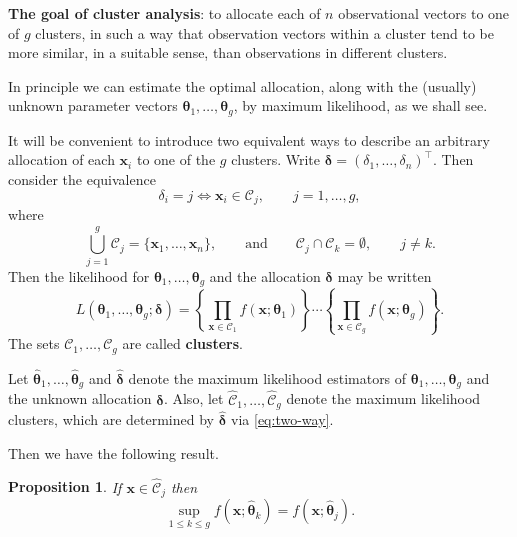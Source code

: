 \documentclass[]{book}
\newtheorem{proposition}{Proposition}[chapter]
\theoremstyle{definition}
\theoremstyle{definition}
\theoremstyle{definition}
\theoremstyle{remark}
\begin{document}
\textbf{The goal of cluster analysis}: to allocate each of \(n\) observational vectors to one of \(g\) clusters, in such a way that observation vectors within a cluster tend to be more similar, in a suitable sense, than observations in different clusters.

In principle we can estimate the optimal allocation, along with the (usually) unknown parameter vectors \(\boldsymbol \theta_1, \ldots , \boldsymbol \theta_g\), by maximum likelihood, as we shall see.

It will be convenient to introduce two equivalent ways to describe an arbitrary allocation of each \(\boldsymbol x_i\) to one of the \(g\) clusters. Write \(\boldsymbol \delta=(\delta_1,\ldots , \delta_n)^\top\). Then consider the equivalence
\begin{equation}
\delta_i = j \iff \boldsymbol x_i \in \mathcal{C}_j, \qquad j=1,\ldots , g,
\label{eq:two-way}
\end{equation}
where
\[
\bigcup_{j=1}^g \mathcal{C}_j = \{\boldsymbol x_1, \ldots , \boldsymbol x_n\}, \qquad \text{and} \qquad \mathcal{C}_j \cap \mathcal{C}_{k} =\emptyset,\qquad j \neq k.
\]
Then the likelihood for \(\boldsymbol \theta_1, \ldots , \boldsymbol \theta_g\) and the allocation \(\boldsymbol \delta\) may be written
\[
L(\boldsymbol \theta_1,\ldots , \boldsymbol \theta_g; \boldsymbol \delta)=\left \{\prod_{\boldsymbol x\in \mathcal{C}_1} f(\boldsymbol x; \boldsymbol \theta_1)\right \}\cdots \left \{\prod_{\boldsymbol x\in \mathcal{C}_g} f(\boldsymbol x; \boldsymbol \theta_g)\right \}.
\]
The sets \(\mathcal{C}_1, \ldots , \mathcal{C}_g\) are called \textbf{clusters}.

Let \(\hat{\boldsymbol \theta}_1, \ldots , \hat{\boldsymbol \theta}_g\) and \(\hat{\boldsymbol \delta}\) denote the maximum likelihood estimators of \(\boldsymbol \theta_1, \ldots , \boldsymbol \theta_g\) and the unknown allocation \(\boldsymbol \delta\).
Also, let \(\hat{\mathcal{C}}_1, \ldots, \hat{\mathcal{C}}_g\) denote the maximum likelihood clusters, which are determined by \(\hat{\boldsymbol \delta}\) via \eqref{eq:two-way}.

Then we have the following result.

\begin{proposition}
\protect\hypertarget{prp:ten1}{}{\label{prp:ten1} }If \(\boldsymbol x\in \hat{\mathcal{C}}_j\) then
\[
\sup_{1 \leq k \leq g}f(\boldsymbol x; \hat{\boldsymbol \theta}_k) = f(\boldsymbol x; \hat{\boldsymbol \theta}_j).
\]
\end{proposition}
\end{document}
